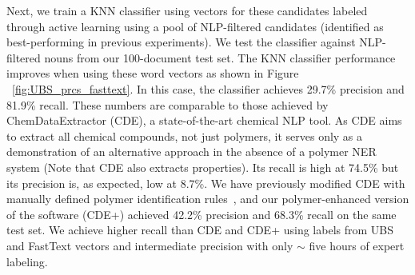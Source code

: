 Next, we train a KNN classifier using vectors for these candidates labeled through active learning using a pool of NLP-filtered candidates (identified as best-performing in previous experiments).
We test the classifier against NLP-filtered nouns from our 100-document test set.
The KNN classifier performance improves when using these word vectors as shown in Figure%
~\ref{fig:UBS_prcs_fasttext}.
In this case, the classifier achieves 29.7\% precision and 81.9\% recall. 
These numbers are comparable to those achieved by ChemDataExtractor (CDE), a state-of-the-art chemical NLP tool.
As CDE aims to extract all
chemical compounds, not just polymers, it serves only as a demonstration of an
alternative approach in the absence of a polymer NER system (Note that CDE also extracts properties). 
Its recall is high
at 74.5\% but its precision is, as expected, low at 8.7\%. 
We have previously modified CDE with
manually defined polymer identification rules~\cite{tchoua2017towards},
and our polymer-enhanced version of the software (CDE+) achieved 42.2\% precision and 68.3\% recall on the same test set. 
We achieve higher recall than CDE and CDE+ using labels from UBS and FastText vectors and intermediate precision with only $\sim$ five hours of expert labeling.

